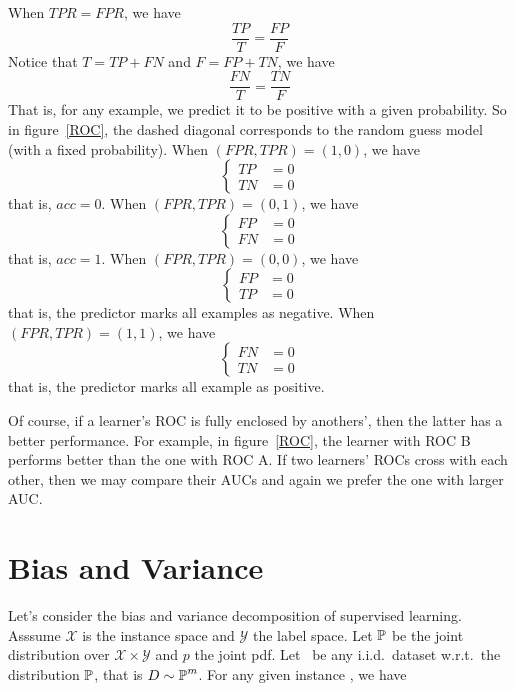 When $TPR = FPR$, we have
$$\frac{TP}{T} = \frac{FP}{F}$$
Notice that $T = TP + FN$ and $F = FP + TN$, we have
$$\frac{FN}{T} = \frac{TN}{F}$$
That is, for any example, we predict it to be positive with a given probability. So in figure~\ref{ROC}, the
dashed diagonal corresponds to the random guess model (with a fixed probability). When $(FPR, TPR) = (1, 0)$,
we have
\begin{equation*}
    \begin{cases}
        TP &= 0\\
        TN &= 0
    \end{cases}
\end{equation*}
that is, $acc = 0$. When $(FPR, TPR) = (0, 1)$, we have
\begin{equation*}
    \begin{cases}
        FP &= 0\\
        FN &= 0
    \end{cases}
\end{equation*}
that is, $acc = 1$. When $(FPR, TPR) = (0, 0)$, we have
\begin{equation*}
    \begin{cases}
        FP &= 0\\
        TP &= 0
    \end{cases}
\end{equation*}
that is, the predictor marks all examples as negative. When $(FPR, TPR) = (1, 1)$, we have
\begin{equation*}
    \begin{cases}
        FN &= 0\\
        TN &= 0
    \end{cases}
\end{equation*}
that is, the predictor marks all example as positive.

Of course, if a learner's ROC is fully enclosed by anothers', then the latter has a better performance.
For example, in figure~\ref{ROC}, the learner with ROC B performs better than the one with ROC A.
If two learners' ROCs cross with each other, then we may compare their AUCs and again we prefer the one with
larger AUC\@.

\section{Bias and Variance}

Let's consider the bias and variance decomposition of supervised learning. Asssume $\mathcal{X}$ is the
instance space and $\mathcal{Y}$ the label space. Let $\operatorname*{\mathbb{P}}$ be the joint distribution over
$\mathcal{X} \times \mathcal{Y}$ and $p$ the joint pdf. Let \dataset\ be any i.i.d.\ dataset w.r.t.\ the
distribution $\operatorname*{\mathbb{P}}$, that is $D \sim \operatorname*{\mathbb{P}}^m$. For any given instance , we have

